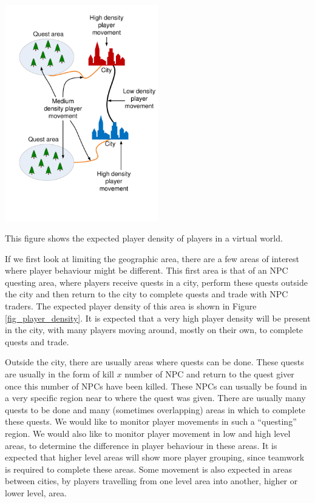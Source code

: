 \documentclass[journal,oneside,a4paper,onecolumn]{IEEEtran}
\begin{document}
\begin{floatingfigure}[l]{0.5\textwidth}
\centering
 \includegraphics[width=0.5\textwidth]{Player_density_expectations}
 \caption{This figure shows the expected player density of players in a virtual world.}
 \label{fig_player_density}
\end{floatingfigure}
%
If we first look at limiting the geographic area, there are a few areas of interest where player behaviour might be different. This first area is
that of an NPC questing area, where players receive quests in a city, perform these quests outside the city and then return to the city to complete
quests and trade with NPC traders. The expected player density of this area is shown in Figure \ref{fig_player_density}. It is expected that a very
high player density will be present in the city, with many players moving around, mostly on their own, to complete quests and trade.

Outside the city, there are usually areas where quests can be done. These quests are usually in the form of kill $x$ number of NPC and return to the
quest giver once this number of NPCs have been killed. These NPCs can usually be found in a very specific region near to where the quest was given.
There are usually many quests to be done and many (sometimes overlapping) areas in which to complete these quests. We would like to monitor player
movements in such a ``questing'' region. We would also like to monitor player movement in low and high level areas, to determine the difference in
player behaviour in these areas. It is expected that higher level areas will show more player grouping, since teamwork is required to complete these
areas. Some movement is also expected in areas between cities, by players travelling from one level area into another, higher or lower level, area.
\end{document}
